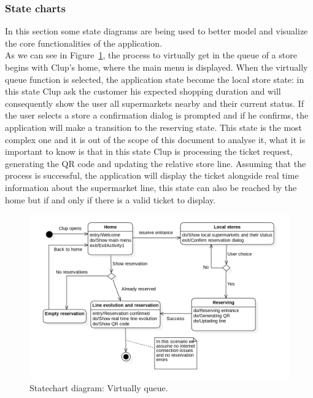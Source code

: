 \subsubsection{State charts}
In this section some state diagrams are being used to better model and visualize the core functionalities of the application.\\
As we can see in Figure~\ref{fig:VirtuallyQ}, the process to virtually get in the queue of a store begins with Clup's home, where the main menu is displayed. When the virtually queue function is selected, the application state become the local store state: in this state Clup ask the customer his expected shopping duration and will consequently show the user all supermarkets nearby and their current status. If the user selects a store a confirmation dialog is prompted and if he confirms, the application will make a transition to the reserving state. \newline
This state is the most complex one and it is out of the scope of this document to analyse it, what it is important to know is that in this state Clup is processing the ticket request, generating the QR code and updating the relative store line. Assuming that the process is successful, the application will display the ticket alongside real time information about the supermarket line, this state can also be reached by the home but if and only if there is a valid ticket to display.\\
\begin{figure} [H]
	\includegraphics[width=\linewidth]{../Diagrams/VirtuallyQueue.png}
	\caption{Statechart diagram: Virtually queue.}
	\label{fig:VirtuallyQ}
\end{figure}

